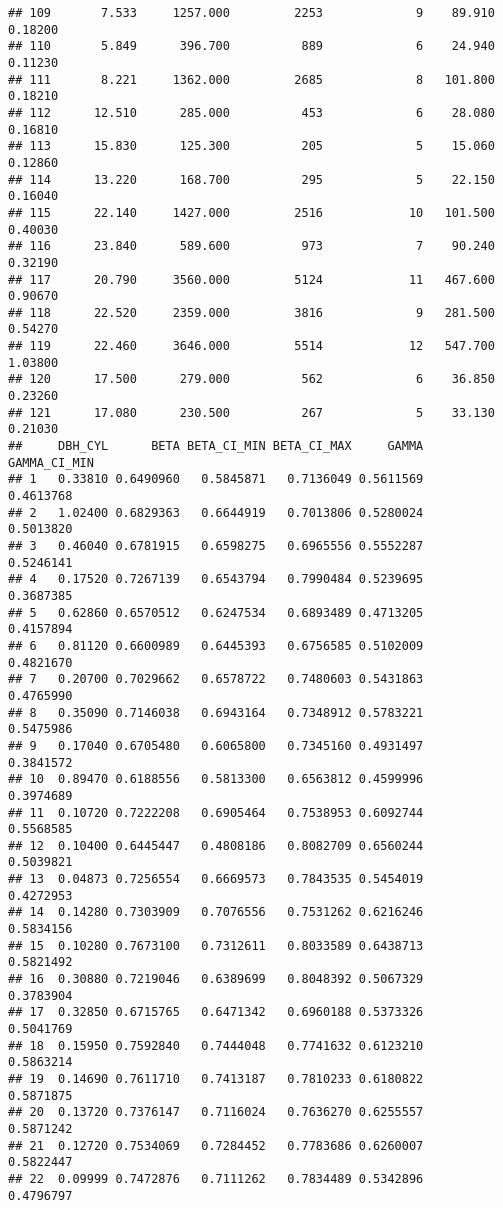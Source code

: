 \documentclass[]{article}
\begin{document}
\begin{verbatim}
## 109       7.533     1257.000         2253             9    89.910 0.18200
## 110       5.849      396.700          889             6    24.940 0.11230
## 111       8.221     1362.000         2685             8   101.800 0.18210
## 112      12.510      285.000          453             6    28.080 0.16810
## 113      15.830      125.300          205             5    15.060 0.12860
## 114      13.220      168.700          295             5    22.150 0.16040
## 115      22.140     1427.000         2516            10   101.500 0.40030
## 116      23.840      589.600          973             7    90.240 0.32190
## 117      20.790     3560.000         5124            11   467.600 0.90670
## 118      22.520     2359.000         3816             9   281.500 0.54270
## 119      22.460     3646.000         5514            12   547.700 1.03800
## 120      17.500      279.000          562             6    36.850 0.23260
## 121      17.080      230.500          267             5    33.130 0.21030
##     DBH_CYL      BETA BETA_CI_MIN BETA_CI_MAX     GAMMA GAMMA_CI_MIN
## 1   0.33810 0.6490960   0.5845871   0.7136049 0.5611569    0.4613768
## 2   1.02400 0.6829363   0.6644919   0.7013806 0.5280024    0.5013820
## 3   0.46040 0.6781915   0.6598275   0.6965556 0.5552287    0.5246141
## 4   0.17520 0.7267139   0.6543794   0.7990484 0.5239695    0.3687385
## 5   0.62860 0.6570512   0.6247534   0.6893489 0.4713205    0.4157894
## 6   0.81120 0.6600989   0.6445393   0.6756585 0.5102009    0.4821670
## 7   0.20700 0.7029662   0.6578722   0.7480603 0.5431863    0.4765990
## 8   0.35090 0.7146038   0.6943164   0.7348912 0.5783221    0.5475986
## 9   0.17040 0.6705480   0.6065800   0.7345160 0.4931497    0.3841572
## 10  0.89470 0.6188556   0.5813300   0.6563812 0.4599996    0.3974689
## 11  0.10720 0.7222208   0.6905464   0.7538953 0.6092744    0.5568585
## 12  0.10400 0.6445447   0.4808186   0.8082709 0.6560244    0.5039821
## 13  0.04873 0.7256554   0.6669573   0.7843535 0.5454019    0.4272953
## 14  0.14280 0.7303909   0.7076556   0.7531262 0.6216246    0.5834156
## 15  0.10280 0.7673100   0.7312611   0.8033589 0.6438713    0.5821492
## 16  0.30880 0.7219046   0.6389699   0.8048392 0.5067329    0.3783904
## 17  0.32850 0.6715765   0.6471342   0.6960188 0.5373326    0.5041769
## 18  0.15950 0.7592840   0.7444048   0.7741632 0.6123210    0.5863214
## 19  0.14690 0.7611710   0.7413187   0.7810233 0.6180822    0.5871875
## 20  0.13720 0.7376147   0.7116024   0.7636270 0.6255557    0.5871242
## 21  0.12720 0.7534069   0.7284452   0.7783686 0.6260007    0.5822447
## 22  0.09999 0.7472876   0.7111262   0.7834489 0.5342896    0.4796797

\end{verbatim}
\end{document}
